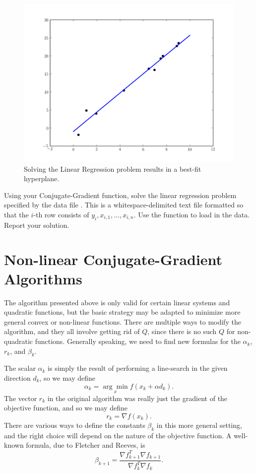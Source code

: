 \begin{figure}
\centering
\includegraphics[width=\textwidth]{linregression.pdf}
\caption{Solving the Linear Regression problem results in a best-fit hyperplane.}
\label{fig:linregression}
\end{figure}

\begin{problem}
Using your Conjugate-Gradient function, solve the linear regression problem specified by the data file
. This is a whitespace-delimited text file formatted so that the $i$-th row consists of
$y_i, x_{i,1}, \ldots, x_{i,n}$. Use the function  to load in the data. Report your solution.
\end{problem}

\section*{Non-linear Conjugate-Gradient Algorithms}
The algorithm presented above is only valid for certain linear systems and quadratic functions, but the basic strategy may be adapted
to minimize more general convex or non-linear functions. There are multiple ways to modify the algorithm, and they all involve getting
rid of $Q$, since there is no such $Q$ for non-quadratic functions. Generally speaking, we need to find new formulas for the $\alpha_k$,
$r_k$, and $\beta_k$.

The scalar $\alpha_k$ is simply the result of performing a line-search in the given direction $d_k$, so we may define
\[
\alpha_k = \underset{x}{\arg\min}f(x_k + \alpha d_k).
\]
The vector $r_k$ in the original algorithm was really just the gradient of the objective
function, and so we may define 
\[
r_k = \nabla f(x_k).
\]
There are various ways to define the constants $\beta_k$ in this more general setting, and the
right choice will depend on the nature of the objective function. A well-known formula, due to Fletcher and Reeves, is
\[
\beta_{k+1} = \frac{\nabla f_{k+1}^T \nabla f_{k+1}}{\nabla f_{k}^T \nabla f_{k}}.
\]

